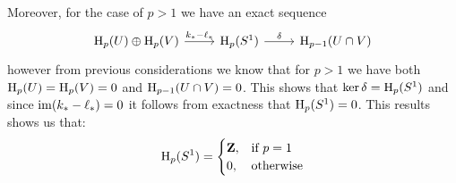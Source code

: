 \begin{example}
    Moreover, for the case of \(p > 1\) we have an exact sequence
    \[
        \begin{tikzcd}
            \Hmlg_p(U) \oplus \Hmlg_p(V) \ar[r, "k_{*} - \ell_{*}"]
            &\Hmlg_p(S^1) \ar[r, "\delta"]
            &\Hmlg_{p-1}(U \cap V)
        \end{tikzcd}
    \]
    however from previous considerations we know that for \(p > 1\) we have both
    \(\operatorname{H}_p(U) = \operatorname{H}_p(V) = 0\) and \(\operatorname{H}_{p-1}(U \cap V) = 0\). This shows that
    \(\ker \delta = \operatorname{H}_p(S^1)\) and since \(\operatorname{im}(k_{*} - \ell_{*}) = 0\) it follows from
    exactness that \(\operatorname{H}_p(S^1) = 0\). This results shows us that:
    \[
        \operatorname{H}_p(S^1) =
        \begin{cases}
            \mathbf{Z}, & \text{if } p = 1 \\
            0,  & \text{otherwise}
        \end{cases}
    \]
\end{example}

